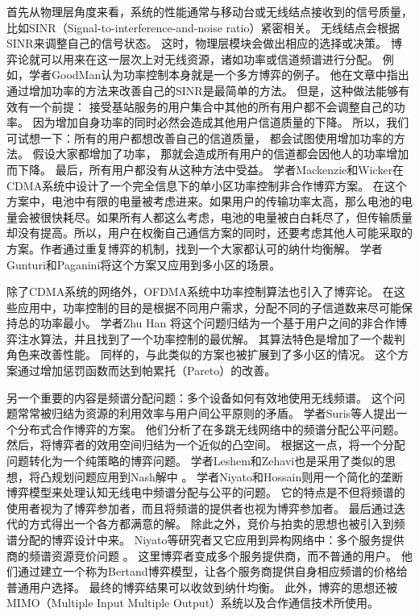 首先从物理层角度来看，系统的性能通常与移动台或无线结点接收到的信号质量，比如SINR（Signal-to-interference-and-noise ratio）紧密相关。
无线结点会根据SINR来调整自己的信号状态。
这时，物理层模块会做出相应的选择或决策。
博弈论就可以用来在这一层次上对无线资源，诸如功率或信道频谱进行分配。
例如，学者GoodMan认为功率控制本身就是一个多方博弈的例子\cite{GoodmanMandayam:2000}。
他在文章中指出通过增加功率的方法来改善自己的SINR是最简单的方法。
但是，这种做法能够有效有一个前提：
接受基站服务的用户集合中其他的所有用户都不会调整自己的功率。
因为增加自身功率的同时必然会造成其他用户信道质量的下降。
所以，我们可试想一下：所有的用户都想改善自己的信道质量，
都会试图使用增加功率的方法。
假设大家都增加了功率，
那就会造成所有用户的信道都会因他人的功率增加而下降。
最后，所有用户都没有从这种方法中受益。
学者Mackenzie和Wicker在CDMA系统中设计了一个完全信息下的单小区功率控制非合作博弈方案\cite{MackenzieWiker:2001}。
在这个方案中，电池中有限的电量被考虑进来。如果用户的传输功率太高，那么电池的电量会被很快耗尽。如果所有人都这么考虑，电池的电量被白白耗尽了，但传输质量却没有提高。所以，用户在权衡自己通信方案的同时，还要考虑其他人可能采取的方案。作者通过重复博弈的机制，找到一个大家都认可的纳什均衡解。
学者Gunturi和Paganini将这个方案又应用到多小区的场景\cite{GunturiPaganini:2003}。

除了CDMA系统的网络外，OFDMA系统中功率控制算法也引入了博弈论。
在这些应用中，功率控制的目的是根据不同用户需求，分配不同的子信道数来尽可能保持总的功率最小。
学者Zhu Han 将这个问题归结为一个基于用户之间的非合作博弈注水算法，并且找到了一个功率控制的最优解\cite{HanZhu:2007}。
其算法特色是增加了一个裁判角色来改善性能。
同样的，与此类似的方案也被扩展到了多小区的情况\cite{WangXue:2006}。
这个方案通过增加惩罚函数而达到帕累托（Pareto）的改善。

另一个重要的内容是频谱分配问题：多个设备如何有效地使用无线频谱。
这个问题常常被归结为资源的利用效率与用户间公平原则的矛盾\cite{JiLiu:2007}。
学者Suris等人提出一个分布式合作博弈的方案\cite{SurisDasilva:2007}\cite{SurisDasilva:2009}。
他们分析了在多跳无线网络中的频谱分配公平问题。
然后，将博弈者的效用空间归结为一个近似的凸空间。
根据这一点，将一个分配问题转化为一个纯策略的博弈问题。
学者Leshem和Zehavi也是采用了类似的思想，将凸规划问题应用到Nash解中
\cite{LeshemZehavi:2008}。 学者Niyato和Hossain则用一个简化的垄断博弈模型来处理认知无线电中频谱分配与公平的问题\cite{NiyatoHossain:2008}。
它的特点是不但将频谱的使用者视为了博弈参加者，而且将频谱的提供者也视为博弈参加者。
最后通过迭代的方式得出一个各方都满意的解。
除此之外，竞价与拍卖的思想也被引入到频谱分配的博弈设计中来。
Niyato等研究者又它应用到异构网络中：多个服务提供商的频谱资源竞价问题 \cite{Niyato:2008}。
这里博弈者变成多个服务提供商，而不普通的用户。
他们通过建立一个称为Bertand博弈模型，让各个服务商提供自身相应频谱的价格给普通用户选择。
最终的博弈结果可以收敛到纳什均衡。
此外，博弈的思想还被MIMO（Multiple   Input   Multiple   Output）系统以及合作通信技术所使用\cite{LiangDandekar:2007}\cite{ChenKishore:2008}。

